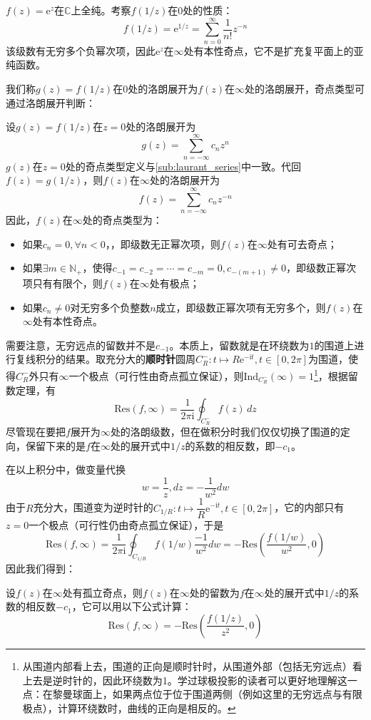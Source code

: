\begin{example}
    $f(z)=\mathrm{e}^{z}$在$\mathbb{C}$上全纯。考察$f(1/z)$在$0$处的性质：
    \[f(1/z)=\mathrm{e}^{1/z}=\sum_{n=0}^{\infty}\frac{1}{n!}z^{-n}\]
    该级数有无穷多个负幂次项，因此$\mathrm{e}^{z}$在$\infty$处有本性奇点，它不是扩充复平面上的亚纯函数。
\end{example}

我们称$g(z)=f(1/z)$在$0$处的洛朗展开为$f(z)$在$\infty$处的洛朗展开，奇点类型可通过洛朗展开判断：
\begin{definition}[无穷远点的洛朗展开与奇点类型]
    设$g(z)=f(1/z)$在$z=0$处的洛朗展开为
    \[g(z)=\sum_{n=-\infty}^{\infty}c_n z^{n}\]
    $g(z)$在$z=0$处的奇点类型定义与\ref{sub:laurant_series}中一致。代回$f(z)=g(1/z)$，则$f(z)$在$\infty$处的洛朗展开为
    \[f(z)=\sum_{n=-\infty}^{\infty}c_n z^{-n}\]
    因此，$f(z)$在$\infty$处的奇点类型为：
    \begin{itemize}
        \item 如果$c_n=0,\forall n<0$，，即级数无正幂次项，则$f(z)$在$\infty$处有可去奇点；
        \item 如果$\exists m\in\mathbb{N}_+$，使得$c_{-1}=c_{-2}=\cdots =c_{-m}=0,c_{-(m+1)}\neq 0$，即级数正幂次项只有有限个，则$f(z)$在$\infty$处有极点；
        \item 如果$c_n\neq 0$对无穷多个负整数$n$成立，即级数正幂次项有无穷多个，则$f(z)$在$\infty$处有本性奇点。
    \end{itemize}
\end{definition}

需要注意，无穷远点的留数并不是$c_{-1}$。本质上，留数就是在环绕数为$1$的围道上进行复线积分的结果。取充分大的\textbf{顺时针}圆周$C^-_R:t\mapsto R\mathrm{e}^{-\mathrm{i}t},t\in[0,2\pi]$为围道，使得$C^-_R$外只有$\infty$一个极点（可行性由奇点孤立保证），则$\mathrm{Ind}_{C^-_R}(\infty)=1$\footnote{从围道内部看上去，围道的正向是顺时针时，从围道外部（包括无穷远点）看上去是逆时针的，因此环绕数为1。学过球极投影的读者可以更好地理解这一点：在黎曼球面上，如果两点位于位于围道两侧（例如这里的无穷远点与有限极点），计算环绕数时，曲线的正向是相反的。}，根据留数定理，有
$$\mathrm{Res}(f,\infty)=\dfrac{1}{2\pi \mathrm{i}}\oint_{C^-_R}f(z)\,dz$$
尽管现在要把$f$展开为$\infty$处的洛朗级数，但在做积分时我们仅仅切换了围道的定向，保留下来的是$f$在$\infty$处的展开式中$1/z$的系数的相反数，即$-c_{1}$。

在以上积分中，做变量代换$$w=\frac{1}{z},dz=-\dfrac{1}{w^2}dw$$
由于$R$充分大，围道变为逆时针的$C_{1/R}:t\mapsto \dfrac{1}{R}\mathrm{e}^{-\mathrm{i}t},t\in[0,2\pi]$，它的内部只有$z=0$一个极点（可行性仍由奇点孤立保证），于是
\[\mathrm{Res}(f,\infty)=\frac{1}{2\pi \mathrm{i}}\oint_{C_{1/R}}f(1/w)\frac{-1}{w^2}dw=-\mathrm{Res}\left(\frac{f(1/w)}{w^2},0\right)\]
因此我们得到：
\begin{proposition}[无穷远点的留数]
    设$f(z)$在$\infty$处有孤立奇点，则$f(z)$在$\infty$处的留数为$f$在$\infty$处的展开式中$1/z$的系数的相反数$-c_{1}$，它可以用以下公式计算：
    \[\mathrm{Res}(f,\infty)=-\mathrm{Res}\left(\frac{f(1/z)}{z^2},0\right)\]
\end{proposition}

